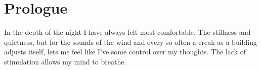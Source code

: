 \chapter*{Prologue} 


In the depth of the night I have always felt most comfortable. The stillness and
quietness, but for the sounds of the wind and every so often a creak as a
building adjusts itself, lets me feel like I've some control over my thoughts.
The lack of stimulation allows my mind to breathe. 